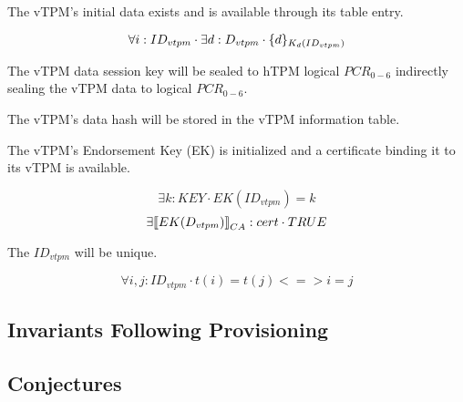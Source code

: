 \documentclass[10pt]{article}
\begin{document}
\begin{post}
  The vTPM's initial data exists and is available through its table entry.

  \[\forall i:ID_{vtpm} \cdot \exists d:D_{vtpm} \cdot \{d\}_{K_{d}(ID_{vtpm})}\]
\end{post}

\begin{post}
  The vTPM data session key will be sealed to hTPM logical $PCR_{0-6}$
  indirectly sealing the vTPM data to logical $PCR_{0-6}$.
\end{post}

\begin{post}
  The vTPM's data hash will be stored in the vTPM information table.
\end{post}

\begin{post}
  The vTPM's Endorsement Key (EK) is initialized and a certificate
  binding it to its vTPM is available.

  \[\exists k:KEY \cdot EK(ID_{vtpm})=k\] 
  \[\exists |[EK(D_{vtpm})|]_{CA}:cert \cdot TRUE\]
\end{post}

\begin{post}
  The $ID_{vtpm}$ will be unique.

  \[\forall i,j:ID_{vtpm} \cdot t(i)=t(j) <=> i=j\]
\end{post}

\subsection{Invariants Following Provisioning}

\subsection{Conjectures}
\end{document}

